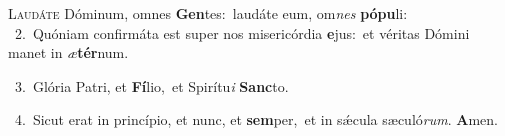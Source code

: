 \lettrine{\initial\textcolor{\initialcolor}{L}}{audáte} Dóminum, omnes \textbf{Gen}\-tes:~\star laudáte eum, om\textit{nes} \textbf{pó}\-\textbf{pu}li:\\
{\numbfont\textcolor{\numbcolor}{~2.}}~Quóniam confirmáta est super nos misericórdia \textbf{e}\-jus:~\star et véritas Dómini manet in \textit{æ}\-\textbf{tér}num.\par
{\numbfont\textcolor{\numbcolor}{~3.}}~Glória Patri, et \textbf{Fí}\-lio,~\star et Spirítu\textit{i} \textbf{Sanc}\-to.\par
{\numbfont\textcolor{\numbcolor}{~4.}}~Sicut erat in princípio, et nunc, et \textbf{sem}\-per,~\star et in sǽcula sæculó\-\textit{rum}\-. \textbf{A}\-men.\par
